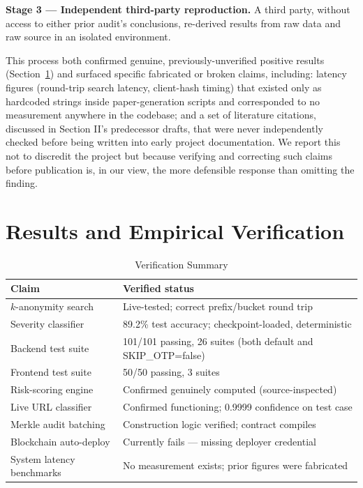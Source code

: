 \documentclass[conference]{IEEEtran}
\begin{document}
\textbf{Stage 3 --- Independent third-party reproduction.} A third party, without access to either prior audit's conclusions, re-derived results from raw data and raw source in an isolated environment.

This process both confirmed genuine, previously-unverified positive results (Section~\ref{sec:results}) and surfaced specific fabricated or broken claims, including: latency figures (round-trip search latency, client-hash timing) that existed only as hardcoded strings inside paper-generation scripts and corresponded to no measurement anywhere in the codebase; and a set of literature citations, discussed in Section II's predecessor drafts, that were never independently checked before being written into early project documentation. We report this not to discredit the project but because verifying and correcting such claims before publication is, in our view, the more defensible response than omitting the finding.

\section{Results and Empirical Verification}
\label{sec:results}

\begin{table}[htbp]
\caption{Verification Summary}
\label{tab:eval}
\centering
\scriptsize
\begin{tabular}{lp{4.5cm}}
\toprule
\textbf{Claim} & \textbf{Verified status} \\
\midrule
$k$-anonymity search & Live-tested; correct prefix/bucket round trip \\
Severity classifier & 89.2\% test accuracy; checkpoint-loaded, deterministic \\
Backend test suite & 101/101 passing, 26 suites (both default and SKIP\_OTP=false) \\
Frontend test suite & 50/50 passing, 3 suites \\
Risk-scoring engine & Confirmed genuinely computed (source-inspected) \\
Live URL classifier & Confirmed functioning; 0.9999 confidence on test case \\
Merkle audit batching & Construction logic verified; contract compiles \\
Blockchain auto-deploy & Currently fails --- missing deployer credential \\
System latency benchmarks & No measurement exists; prior figures were fabricated \\
\bottomrule
\end{tabular}
\end{table}
\end{document}
